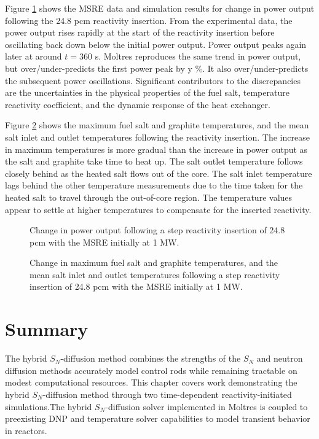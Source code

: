 Figure \ref{fig:insertion-power} shows the \gls{MSRE} data and simulation results for change in
power output following the 24.8 pcm reactivity
insertion. From the experimental data, the power output rises rapidly at the start of the
reactivity insertion before oscillating back down below the initial power output. Power output
peaks again later at around $t=360$ s. Moltres reproduces the same trend in power output, but 
over/under-predicts the first power peak by y \%. It also over/under-predicts the subsequent power
oscillations.
Significant contributors to the discrepancies are the uncertainties in the physical properties of
the fuel salt, temperature reactivity coefficient, and the dynamic response of the heat exchanger.

Figure \ref{fig:insertion-temperature} shows the maximum fuel salt and graphite temperatures, and
the mean salt inlet and outlet
temperatures following the reactivity insertion. The increase in maximum temperatures is more
gradual than the increase in power output as the salt and graphite take time to heat up. The salt
outlet temperature follows closely behind as the heated salt flows out of the core. The salt inlet
temperature lags behind the other temperature measurements due to the time taken for the heated
salt to travel through the out-of-core region. The temperature values appear to settle at higher
temperatures to compensate for the inserted reactivity.

\begin{figure}[t]
  \centering
  \caption{Change in power output following a step reactivity insertion of 24.8 pcm with the
  \gls{MSRE} initially at 1 MW.}
  \label{fig:insertion-power}
\end{figure}

\begin{figure}[t]
  \centering
  \caption{Change in maximum fuel salt and graphite temperatures, and the mean salt inlet and outlet
  temperatures following a step reactivity insertion of 24.8 pcm with the \gls{MSRE} initially at 1
  MW.}
  \label{fig:insertion-temperature}
\end{figure}

\section{Summary} \label{sec:transient-summary}

The hybrid $S_N$-diffusion method combines the strengths of the $S_N$ and neutron
diffusion methods accurately model control rods while remaining tractable on modest computational
resources. This chapter covers work demonstrating the hybrid $S_N$-diffusion method through two
time-dependent reactivity-initiated simulations.The hybrid $S_N$-diffusion solver implemented in
Moltres is coupled to preexisting \gls{DNP} and temperature solver capabilities to model
transient behavior in reactors. 

